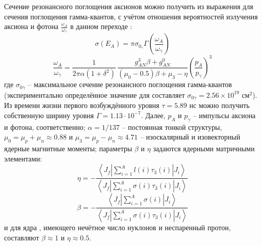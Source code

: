 \documentclass[a4paper,article,14pt]{extarticle}
\begin{document}
Сечение резонансного поглощения аксионов можно получить из выражения для сечения поглощения гамма-квантов, с учётом отношения вероятностей излучения аксиона и фотона $\frac{\omega_A}{\omega _{\gamma}}$ в данном переходе \cite{donnelly1978axions}:
\begin{equation} \label{sech}
    \sigma(E_A) =
        \pi \sigma_{0_\gamma} \Gamma
        \left(
            \frac{\omega _A}{\omega _\gamma}
        \right)
\end{equation}
\begin{equation} \label{wAwy}
    \frac{\omega_A}{\omega_\gamma} =
        \frac{1}{2 \pi \alpha (1 + \delta^2)}\,
        \frac{g_{AN}^3 \beta + g_{AN}^0}{(\mu_0 - 0.5)\beta + \mu_3 - \eta}
        \left(
            {\frac{{{p_A}}}{{{p _\gamma }}}}
        \right)^3
\end{equation}
где  $\sigma_{0\gamma}$ -- максимальное сечение резонансного поглощения гамма-квантов (экспериментально определённое значение для {\Tm} составляет $\sigma_{0\gamma} = 2.56 \times 10^{19} \text{ см}^2$).
Из времени жизни первого возбуждённого уровня $\tau = 5.89 \text{ нс}$ можно получить собственную ширину уровня $\Gamma = 1.13 \cdot 10^{-7}$. 
Далее, $p_A$ и $p_{\gamma}$ -- импульсы аксиона и фотона, соответственно; $\alpha = 1/137$ -- постоянная тонкой структуры, $\mu_0 = \mu_p + \mu_n \approx 0.88$ и $\mu_3 = \mu_p - \mu_n \approx 4.71$ -- изоскалярный и изовекторный ядерные магнитные моменты; параметры $\beta$ и $\eta$ задаются ядерными матричными элементами:
\begin{equation}
    \eta =
        - \frac{
            \left\langle
                J_f
                    \left|
                        \sum\limits_{i = 1}^A {l(i){\tau_3}(i)}
                    \right|
                J_i
            \right\rangle
        }
        {
            \left\langle
                J_f
                    \left|
                        \sum\limits_{i = 1}^A {\sigma (i){\tau _3}(i)}
                    \right|
                J_i
            \right\rangle
        }
\end{equation}
\begin{equation}
    \beta =
        - \frac{
            \left\langle
                J_f
                    \left|
                        \sum\limits_{i = 1}^A \sigma (i)
                    \right|
                        J_i
            \right\rangle
        }
        {
            \left\langle
                J_f
                    \left|
                        \sum\limits_{i = 1}^A \sigma (i){\tau _3}(i) 
                    \right|
                J_i
            \right\rangle
        }
\end{equation}
и для ядра {\Tm}, имеющего нечётное число нуклонов и неспаренный протон, составляют $\beta \approx 1$ и $\eta \approx 0.5$. 
\end{document}

